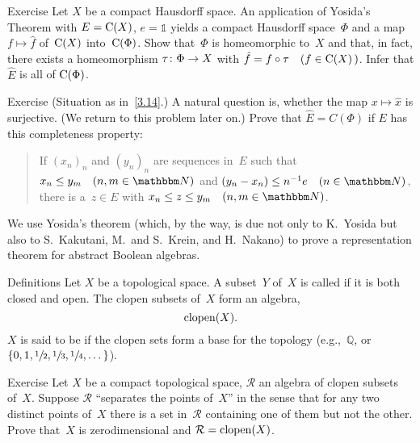 \documentclass[main.tex]{subfiles}
\begin{document}
%
%
\begin{psec}{3.15}{Exercise}
Let $X$ be a compact Hausdorff space.
An application of Yosida's Theorem with $E=\mathrm{C}(X)$,
$e=\mathbb{1}$ yields
a compact Hausdorff space~$\Phi$
and a map $f\mapsto\hat{f}$ of~$\mathrm{C}(X)$ into~$\mathrm{C}(\Phi)$.
Show that~$\Phi$ is homeomorphic to~$X$
and that, in fact, there exists a homeomorphism
$\tau\colon \Phi\rightarrow X$ with $\hat{f}=f\circ \tau\quad(f\in \mathrm{C}(X)\, )$.
Infer that $\hat{E}$ is all of $\mathrm{C}(\Phi)$.
\end{psec}
%
%
\begin{psec}{3.16}{Exercise}
(Situation as in~\ref{3.14}.)
A natural question is,
whether the map $x\mapsto \hat{x}$ is surjective.
(We return to this problem later on.)
Prove that $\hat{E}=C(\Phi)$ if $E$ has this completeness property:
\begin{quote}
If $(x_n)_n$ and $(y_n)_n$ are sequences in~$E$
such that $x_n \leq y_m\quad (n,m\in \N)$
and $(y_n-x_n)\leq n^{-1} e\quad (n\in \N)$,
there is a~$z\in E$ with $x_n\leq z\leq y_m \quad (n,m\in \N)$.
\end{quote}
\end{psec}
%
%
We use Yosida's theorem
(which, by the way, 
is due not only to 
K.~Yosida
but also to 
S.~Kakutani,
M.~and S.~Krein,
and H.~Nakano)
to prove a representation theorem
for abstract Boolean algebras.
\begin{psec}{3.17}{Definitions}
Let $X$ be a topological space.
A subset~$Y$ of~$X$
is called  if it is both closed and open.
The clopen subsets of~$X$ form an algebra,
\begin{equation*}
\mathrm{clopen}(X)\text{.}
\end{equation*}
$X$ is said to be 
if the clopen sets form a base 
for the topology (e.g.,~$\mathbb{Q}$, 
or $\{0,1,\sfrac{1}{2},\sfrac{1}{3},\sfrac{1}{4},\dotsc\}$).
\end{psec}
%
%
\begin{psec}{3.18}{Exercise}
Let $X$ be a compact topological space,
$\mathcal{R}$ an algebra of clopen subsets of~$X$.
Suppose $\mathcal{R}$ ``separates the points of~$X$''
in the sense that for any two distinct points of~$X$
there is a set in~$\mathcal{R}$
containing one of them but not the other.
Prove that~$X$ is zerodimensional
and $\mathcal{R}=\mathrm{clopen}(X)$.
\end{psec}
%
%
\end{document}

